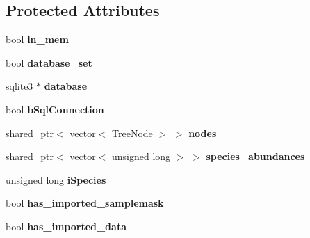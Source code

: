 \subsection*{Protected Attributes}
\begin{DoxyCompactItemize}
\item 
bool {\bfseries in\+\_\+mem}\hypertarget{class_community_abc144eeba19574b6b46df384a61acc6f}{}\label{class_community_abc144eeba19574b6b46df384a61acc6f}

\item 
bool {\bfseries database\+\_\+set}\hypertarget{class_community_a7e00bcb1c5a24280346df94853e2919b}{}\label{class_community_a7e00bcb1c5a24280346df94853e2919b}

\item 
sqlite3 $\ast$ {\bfseries database}\hypertarget{class_community_a382c0e6e90ca8055d3192bfe2af4d741}{}\label{class_community_a382c0e6e90ca8055d3192bfe2af4d741}

\item 
bool {\bfseries b\+Sql\+Connection}\hypertarget{class_community_aa9fe335ff9e94c626d1e0d41ff145524}{}\label{class_community_aa9fe335ff9e94c626d1e0d41ff145524}

\item 
shared\+\_\+ptr$<$ vector$<$ \hyperlink{class_tree_node}{Tree\+Node} $>$ $>$ {\bfseries nodes}\hypertarget{class_community_a7019c54cac091bc6c15906f6faaf0a49}{}\label{class_community_a7019c54cac091bc6c15906f6faaf0a49}

\item 
shared\+\_\+ptr$<$ vector$<$ unsigned long $>$ $>$ {\bfseries species\+\_\+abundances}\hypertarget{class_community_aed2dedc597a747d86617b7010abaff51}{}\label{class_community_aed2dedc597a747d86617b7010abaff51}

\item 
unsigned long {\bfseries i\+Species}\hypertarget{class_community_a094f10ce5bbbcab19bccda352f545aad}{}\label{class_community_a094f10ce5bbbcab19bccda352f545aad}

\item 
bool {\bfseries has\+\_\+imported\+\_\+samplemask}\hypertarget{class_community_a6c3c70184f586330635a4123699f586f}{}\label{class_community_a6c3c70184f586330635a4123699f586f}

\item 
bool {\bfseries has\+\_\+imported\+\_\+data}\hypertarget{class_community_a0371c39658281c8956c29c6b2d564b79}{}\label{class_community_a0371c39658281c8956c29c6b2d564b79}


\end{DoxyCompactItemize}
